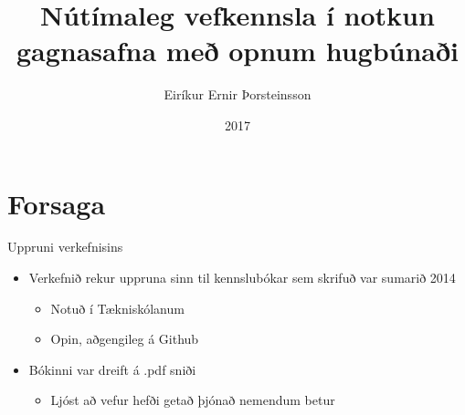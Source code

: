 \documentclass[hi-blar]{beamer}
\title{Nútímaleg vefkennsla í notkun gagnasafna með opnum hugbúnaði}
\author{Eiríkur Ernir Þorsteinsson}
\institute{Háskóli Íslands}
\date{2017}
\begin{document}
{
    \frame{\titlepage}
}


\frame{\tableofcontents}

\newenvironment{repnull}[0]{%
\begin{stack}
\\
\begin{rep}
}{%
\end{rep}
\end{stack}
}
\newenvironment{syntaxenv}[1]{%
\par\noindent\begin{minipage}{\linewidth}\vspace{0.5em}\begin{quote}\noindent%
\hspace*{-2em}\synt{#1}:\hfill\par%
\noindent%
\begin{minipage}{\linewidth}\begin{syntdiag}%
}{%
\end{syntdiag}\end{minipage}\end{quote}\end{minipage}%
}

\section{Forsaga}

\begin{frame}{Uppruni verkefnisins}
    \begin{itemize}
        \item Verkefnið rekur uppruna sinn til kennslubókar sem skrifuð var sumarið 2014
        \begin{itemize}
            \item Notuð í Tækniskólanum
            \item Opin, aðgengileg á Github
        \end{itemize}
        \item Bókinni var dreift á .pdf sniði
        \begin{itemize}
            \item Ljóst að vefur hefði getað þjónað nemendum betur
        \end{itemize}
    \end{itemize}
\end{frame}
\end{document}
